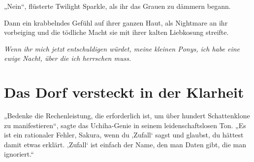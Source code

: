 „Nein“, flüsterte Twilight Sparkle, als ihr das Grauen zu dämmern begann.

Dann ein krabbelndes Gefühl auf ihrer ganzen Haut, als Nightmare an ihr vorbeiging und die tödliche Macht sie mit ihrer kalten Liebkosung streifte.

\emph{Wenn ihr mich jetzt entschuldigen würdet, meine kleinen Ponys, ich habe eine ewige Nacht, über die ich herrschen muss.}

\section{Das Dorf versteckt in der Klarheit\protect\footnotemark}

„Bedenke die Rechenleistung, die erforderlich ist, um über hundert Schattenklone zu manifestieren“, sagte das Uchiha-Genie in seinem leidenschaftslosen Ton.
„Es ist ein rationaler Fehler, Sakura, wenn du ‚Zufall‘ sagst und glaubst, du hättest damit etwas erklärt. ‚Zufall‘ ist einfach der Name, den man Daten gibt, die man ignoriert.“

